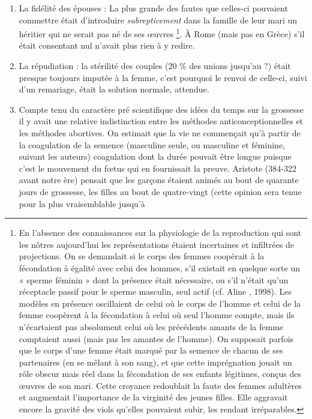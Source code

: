 \begin{enumerate}
\item La fidélité des épouses : La plus grande des fautes que celles-ci
pouvaient commettre était d'introduire \emph{subrepticement} dans la famille de
leur mari un héritier qui ne serait pas né de ses œuvres%
\footnote{En l'absence des connaissances sur la physiologie de la reproduction qui sont les nôtres aujourd'hui les représentations étaient incertaines et infiltrées de projections. On se demandait si le corps des femmes coopérait à la 
fécondation à égalité avec celui des hommes, s'il existait en quelque sorte un « sperme féminin » dont la présence 
était nécessaire, ou s'il n'était qu'un réceptacle passif pour le sperme masculin, seul actif (cf. Aline , 
1998). Les modèles en présence oscillaient de celui où le corps de l'homme et celui de la femme coopèrent à la fécondation à celui où seul l'homme compte, mais ils n'écartaient pas absolument celui où les précédents amants de 
la femme comptaient aussi (mais pas les amantes de l'homme). On supposait parfois que le corps d'une femme 
était marqué par la semence de chacun de ses partenaires (en se mêlant à son sang), et que cette imprégnation jouait
un rôle obscur mais réel
dans la fécondation de ses
enfants légitimes,
conçus des œuvres
de son mari. Cette 
croyance redoublait la faute des femmes adultères et augmentait l'importance de la virginité des jeunes filles. Elle 
aggravait encore la gravité des viols qu'elles pouvaient subir, les rendant irréparables.}.
À Rome (mais pas en Grèce) s'il était consentant nul n'avait plus rien à y redire.
\item La répudiation : la stérilité des couples (20 \% des unions jusqu'au
 ?) était presque toujours imputée à la femme, c'est
pourquoi le renvoi de celle-ci, suivi d'un remariage, était la solution normale,
attendue.
\item Compte tenu du caractère pré scientifique des idées du temps
sur la grossesse il y avait une relative indistinction entre les méthodes anticonceptionnelles
et les méthodes abortives. On estimait que la vie ne
commençait qu'à partir de la coagulation de la semence (masculine seule,
ou masculine et féminine, suivant les auteurs) coagulation dont la durée
pouvait être longue puisque c'est le mouvement du fœtus qui en fournissait
la preuve. Aristote (384-322 avant notre ère) pensait que les garçons
étaient animés au bout de quarante jours de grossesse, les filles au bout
de quatre-vingt (cette opinion sera tenue pour la plus vraisemblable jusqu'à

\end{enumerate}
